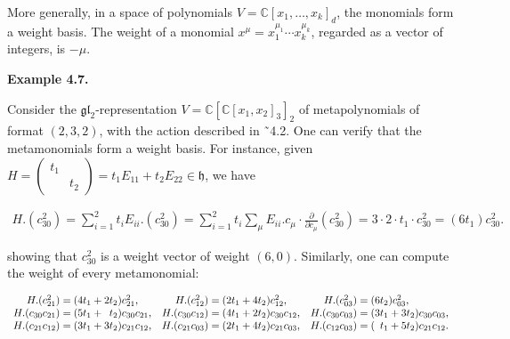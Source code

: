 More generally, in a space of polynomials $V=\mathbb{C}[x_{1},\ldots,x_{k}]_{d}$, the monomials form a weight basis. The weight of a monomial $x^{\mu}=x_{1}^{\mu_{1}}\cdots x_{k}^{\mu_{k}}$, regarded as a vector of integers, is $-\mu$.






\par\medskip\noindent\textbf{Example 4.7.}\par



Consider the $\mathfrak{gl}_{2}$-representation $V=\mathbb{C}[\mathbb{C}[x_{1},x_{2}]_{3}]_{2}$ of metapolynomials of format $(2,3,2)$, with the action described in ˜4.2. One can verify that the metamonomials form a weight basis. For instance, given $H=\left(\begin{smallmatrix}t_{1}&\\ &t_{2}\end{smallmatrix}\right)=t_{1}E_{11}+t_{2}E_{22}\in\mathfrak{h}$, we have



\[\begin{aligned}
H.(c_{30}^{2})=\textstyle\sum_{i=1}^{2}t_{i}E_{ii}.(c_{30}^{2})=\textstyle\sum_{i=1}^{2}t_{i}\sum_{\mu}E_{ii}.c_{\mu}\cdot\displaystyle\frac{\partial}{\partial c_{\mu}}(c_{30}^{2})=3\cdot 2\cdot t_{1}\cdot c_{30}^{2}=(6t_{1})c_{30}^{2}.
\end{aligned}\]


showing that $c_{30}^{2}$ is a weight vector of weight $(6,0)$. Similarly, one can compute the weight of every metamonomial:



\[\begin{aligned}
\begin{array}[]{rlrlrl}H.(c_{21}^{2})=\hskip-7.39998pt&(4t_{1}+2t_{2})c_{21}^{2},&H.(c_{12}^{2})=\hskip-7.39998pt&(2t_{1}+4t_{2})c_{12}^{2},&H.(c_{03}^{2})=\hskip-7.39998pt&(6t_{2})c_{03}^{2},\\ H.(c_{30}c_{21})=\hskip-7.39998pt&(5t_{1}+\phantom{1}t_{2})c_{30}c_{21},&H.(c_{30}c_{12})=\hskip-7.39998pt&(4t_{1}+2t_{2})c_{30}c_{12},&H.(c_{30}c_{03})=\hskip-7.39998pt&(3t_{1}+3t_{2})c_{30}c_{03},\\ H.(c_{21}c_{12})=\hskip-7.39998pt&(3t_{1}+3t_{2})c_{21}c_{12},&H.(c_{21}c_{03})=\hskip-7.39998pt&(2t_{1}+4t_{2})c_{21}c_{03},&H.(c_{12}c_{03})=\hskip-7.39998pt&(\phantom{1}t_{1}+5t_{2})c_{21}c_{12}.\end{array}
\end{aligned}\]


